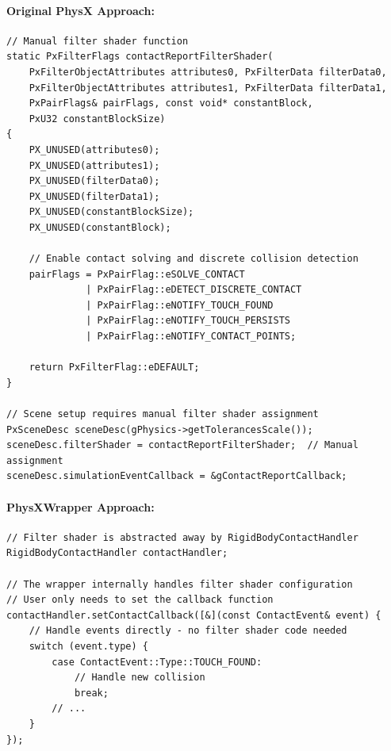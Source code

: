 \paragraph{Original PhysX Approach:}

\begin{lstlisting}[style=cpp, caption=Original Filter Shader Implementation]
// Manual filter shader function
static PxFilterFlags contactReportFilterShader(
    PxFilterObjectAttributes attributes0, PxFilterData filterData0,
    PxFilterObjectAttributes attributes1, PxFilterData filterData1,
    PxPairFlags& pairFlags, const void* constantBlock,
    PxU32 constantBlockSize)
{
    PX_UNUSED(attributes0);
    PX_UNUSED(attributes1);
    PX_UNUSED(filterData0);
    PX_UNUSED(filterData1);
    PX_UNUSED(constantBlockSize);
    PX_UNUSED(constantBlock);

    // Enable contact solving and discrete collision detection
    pairFlags = PxPairFlag::eSOLVE_CONTACT
              | PxPairFlag::eDETECT_DISCRETE_CONTACT
              | PxPairFlag::eNOTIFY_TOUCH_FOUND
              | PxPairFlag::eNOTIFY_TOUCH_PERSISTS
              | PxPairFlag::eNOTIFY_CONTACT_POINTS;

    return PxFilterFlag::eDEFAULT;
}

// Scene setup requires manual filter shader assignment
PxSceneDesc sceneDesc(gPhysics->getTolerancesScale());
sceneDesc.filterShader = contactReportFilterShader;  // Manual assignment
sceneDesc.simulationEventCallback = &gContactReportCallback;
\end{lstlisting}

\paragraph{PhysXWrapper Approach:}

\begin{lstlisting}[style=cpp, caption=Wrapper Approach - No Filter Shader Needed]
// Filter shader is abstracted away by RigidBodyContactHandler
RigidBodyContactHandler contactHandler;

// The wrapper internally handles filter shader configuration
// User only needs to set the callback function
contactHandler.setContactCallback([&](const ContactEvent& event) {
    // Handle events directly - no filter shader code needed
    switch (event.type) {
        case ContactEvent::Type::TOUCH_FOUND:
            // Handle new collision
            break;
        // ...
    }
});
\end{lstlisting}

